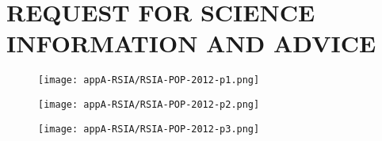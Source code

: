 \documentclass[11pt]{book}
\begin{document}
\renewcommand{\thesection}{\thechapter.\arabic{section}}   
\renewcommand{\thetable}{\thechapter.\arabic{table}}    
\renewcommand{\thefigure}{\thechapter.\arabic{figure}}  
\renewcommand{\theequation}{\thechapter.\arabic{equation}}

  


\clearpage

\setcounter{page}{31}

\chapter{REQUEST FOR SCIENCE INFORMATION AND ADVICE} 


\begin{figure}[h!]
	\centering
	\texttt{[image: appA-RSIA/RSIA-POP-2012-p1.png]}
\end{figure}

\begin{figure}[tb]
	\centering
	\texttt{[image: appA-RSIA/RSIA-POP-2012-p2.png]}
\end{figure}

\begin{figure}[tb]
	\centering
	\texttt{[image: appA-RSIA/RSIA-POP-2012-p3.png]}
\end{figure}

\clearpage
\end{document}
